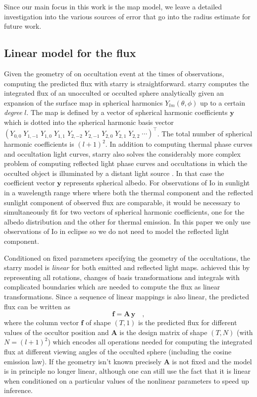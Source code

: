 \documentclass[linenumbers,modern]{aastex62}
\begin{document}
Since our main focus in this work is the map model, we leave a detailed investigation into the various sources of error that go into the radius estimate for future work.

\subsection{Linear model for the flux}
\label{ssec:model_spec}
Given the geometry of on occultation event at the times of observations, computing the predicted flux with \textsf{starry} is straightforward.
\textsf{starry} computes the integrated flux of an unocculted or occulted sphere analytically given an expansion of the surface map in spherical harmonics $Y_{lm}(\theta,\phi)$ up to a certain \emph{degree} $l$.
The map is defined by a vector of spherical harmonic coefficients $\mathbf{y}$ which is dotted into the spherical harmonic basis vector $\left(Y_{0,0}\;Y_{1,-1}\;Y_{1,0}\;Y_{1,1}\;Y_{2,-2}\;Y_{2,-1}\;Y_{2,0}\;Y_{2,1}\;Y_{2,2}\; \cdots\right)^{\top}$.
The total number of spherical harmonic coefficients is $(l+1)^2$.
In addition to computing thermal phase curves and occultation light curves, \textsf{starry} also solves the considerably more complex problem of computing reflected light phase curves and occultations in which the occulted object is illuminated by a distant light source \citep{luger2021b}. 
In that case the coefficient vector $\mathbf{y}$ represents spherical albedo.
For observations of Io in sunlight in a wavelength range where where both the thermal component and the reflected sunlight component of observed flux are comparable, it would be necessary to simultaneously fit for two vectors of spherical harmonic coefficients, one for the albedo distribution and the other for thermal emission.
In this paper we only use observations of Io in eclipse so we do not need to model the reflected light component.

Conditioned on fixed parameters specifying the geometry of the occultations, the \textsf{starry} model is \emph{linear} for both emitted and reflected light maps.
\cite{luger2019a} achieved this by representing all rotations, changes of basis transformations and integrals with complicated boundaries which are needed to compute the flux as linear transformations.
Since a sequence of linear mappings is also linear, the predicted flux can be written as
\begin{equation}
    \mathbf{f}=\mathbf{A}\,\mathbf{y}
    \quad,
    \label{eq:linear_model}
\end{equation}
where the column vector $\mathbf{f}$ of shape $(T, 1)$ is the predicted flux for different values of the occultor position and $\mathbf{A}$ is the design matrix \citep[see appendix B.1. in ][]{luger2021a} of shape $(T, N)$ (with $N=(l+1)^2$) which encodes all operations needed for computing the integrated flux at different viewing angles of the occulted sphere (including the cosine emission law).
If the geometry isn't known precisely $\mathbf{A}$ is not fixed and the model is in principle no longer linear, although one can still use the fact that it is linear when conditioned on a particular values of the nonlinear parameters to speed up inference.
\end{document}
